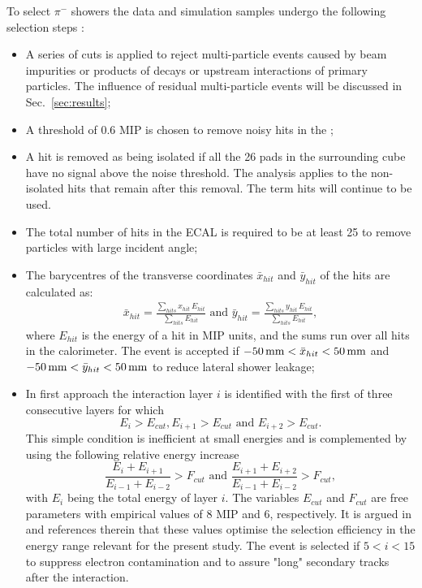 To select $\pi^-$ showers the data and simulation samples undergo the following selection steps \cite{Bilki:2014uep}\cite{bib:Doublet}: 
\begin{itemize}
	\item A series of cuts is applied to reject multi-particle events caused by beam impurities or products of decays or upstream interactions of primary particles. The influence of residual multi-particle events will be discussed in Sec.~\ref{sec:results};
	\item A threshold of 0.6 MIP is chosen to remove noisy hits in the \ecal;
	\item A hit is removed as being isolated if all the 26 pads in the surrounding cube have no signal above the noise threshold. The analysis applies to the non-isolated hits that remain after this removal. The term hits will continue to be used.   
	\item The total number of hits in the ECAL is required to be at least 25 to remove particles with large incident angle;
	\item The barycentres of the transverse coordinates $\bar{x}_{hit}$ and $\bar{y}_{hit}$ of the hits are calculated as:
	\begin{eqnarray}
	\label{eq:barycentre}
	\bar{x}_{hit} = \frac{\displaystyle \sum_{hits} x_{hit}\,E_{hit}}{\displaystyle \sum_{hits} E_{hit}} 
	\text{ and }
	\bar{y}_{hit} = \frac{\displaystyle \sum_{hits} y_{hit}\,E_{hit}}{\displaystyle \sum_{hits} E_{hit}},
	\end{eqnarray}
	where $E_{hit}$ is the energy of a hit in MIP units, and the sums run over all hits in the calorimeter.
	The event is accepted if $-50\,{\rm mm} < \bar{x}_{hit} < 50\,{\rm mm}$ and $-50\,{\rm mm} < \bar{y}_{hit} < 50\,{\rm mm}$ to
	reduce lateral shower leakage;
	\item  In first approach the interaction layer $i$ is identified with the first of three consecutive layers for which
	\begin{equation}
	E_i > E_{cut}, E_{i+1} > E_{cut}  \text{ and } E_{i+2} > E_{cut}.
	\end{equation}
	This simple condition is inefficient at small energies and is complemented by using the following relative energy increase
	\begin{equation}
	\frac{E_i+E_{i+1}}{E_{i-1} + E_{i-2}} > F_{cut} \text{ and } 
	\frac{E_{i+1}+E_{i+2}}{E_{i-1} + E_{i-2}} > F_{cut}, 
	\end{equation}
	with $E_i$ being the total energy of layer $i$. The variables $E_{cut}$ and $F_{cut}$ are free parameters with empirical values of 8 MIP and 6, respectively. It is argued in \cite{Bilki:2014uep} and references therein that these values optimise the selection efficiency in the energy range relevant for the present study.
	The event is selected if $5 < i < 15$ to suppress electron contamination and to assure "long" secondary tracks after the interaction.
\end{itemize}
